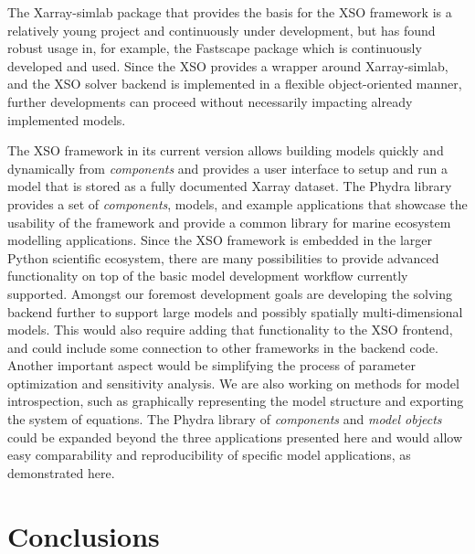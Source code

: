 \documentclass[journal abbreviation, manuscript]{copernicus}
\begin{document}
The Xarray-simlab package that provides the basis for the XSO framework is a relatively young project and continuously under development, but has found robust usage in, for example, the Fastscape package \citep{Bovy2021Fastscape-lem/fastscape:V0.1.0beta3} which is continuously developed and used. 
Since the XSO provides a wrapper around Xarray-simlab, and the XSO solver backend is implemented in a flexible object-oriented manner, further developments can proceed without necessarily impacting already implemented models.

The XSO framework in its current version allows building models quickly and dynamically from \textit{components} and provides a user interface to setup and run a model that is stored as a fully documented Xarray dataset. The Phydra library provides a set of \textit{components}, models, and example applications that showcase the usability of the framework and provide a common library for marine ecosystem modelling applications. Since the XSO framework is embedded in the larger Python scientific ecosystem, there are many possibilities to provide advanced functionality on top of the basic model development workflow currently supported. Amongst our foremost development goals are developing the solving backend further to support large models and possibly spatially multi-dimensional models. This would also require adding that functionality to the XSO frontend, and could include some connection to other frameworks in the backend code. Another important aspect would be simplifying the process of parameter optimization and sensitivity analysis. We are also working on methods for model introspection, such as graphically representing the model structure and exporting the system of equations. 
The Phydra library of \textit{components} and \textit{model objects} could be expanded beyond the three applications presented here and would allow easy comparability and reproducibility of specific model applications, as demonstrated here.


\section{Conclusions}
\end{document}

